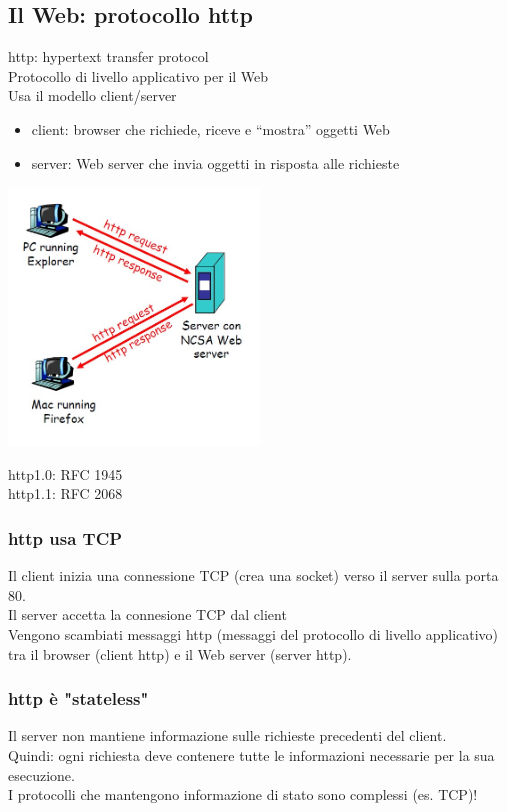 \subsection{Il Web: protocollo http}
http: hypertext transfer protocol
\\Protocollo di livello applicativo per il Web
\\Usa il modello client/server
\begin{itemize}
    \item client: browser che richiede, riceve e “mostra” oggetti Web
    \item server: Web server che invia oggetti in risposta alle richieste
\end{itemize}
\begin{center}
    \includegraphics[width=0.5\textwidth]{img/MOC_protocolli2.jpg}
\end{center}
http1.0: RFC 1945
\\http1.1: RFC 2068

\subsubsection{http usa TCP}
Il client inizia una connessione TCP (crea una socket) verso il server sulla porta 80.
\\Il server accetta la connesione TCP dal client
\\Vengono scambiati messaggi http (messaggi del protocollo di livello applicativo) tra il browser (client http) e il Web server (server http).

\subsubsection{http è "stateless"}
Il server non mantiene informazione sulle richieste precedenti del client.
\\Quindi: ogni richiesta deve contenere tutte le informazioni necessarie per la sua esecuzione.
\\I protocolli che mantengono informazione di stato sono complessi (es. TCP)!

